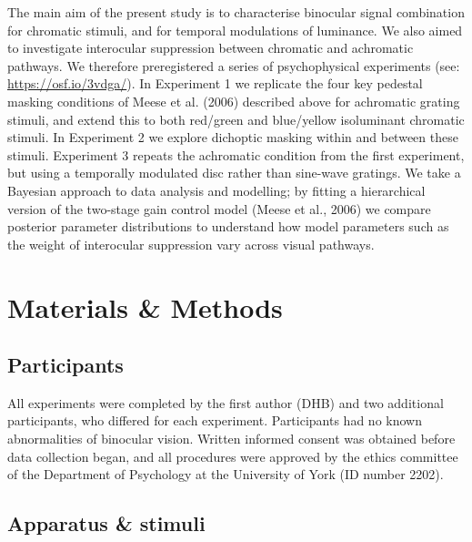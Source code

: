 \documentclass[
]{article}
\begin{document}
The main aim of the present study is to characterise binocular signal combination for chromatic stimuli, and for temporal modulations of luminance. We also aimed to investigate interocular suppression between chromatic and achromatic pathways. We therefore preregistered a series of psychophysical experiments (see: \url{https://osf.io/3vdga/}). In Experiment 1 we replicate the four key pedestal masking conditions of Meese et al. (2006) described above for achromatic grating stimuli, and extend this to both red/green and blue/yellow isoluminant chromatic stimuli. In Experiment 2 we explore dichoptic masking within and between these stimuli. Experiment 3 repeats the achromatic condition from the first experiment, but using a temporally modulated disc rather than sine-wave gratings. We take a Bayesian approach to data analysis and modelling; by fitting a hierarchical version of the two-stage gain control model (Meese et al., 2006) we compare posterior parameter distributions to understand how model parameters such as the weight of interocular suppression vary across visual pathways.

\hypertarget{materials-methods}{%
\section{Materials \& Methods}\label{materials-methods}}

\hypertarget{participants}{%
\subsection{Participants}\label{participants}}

All experiments were completed by the first author (DHB) and two additional participants, who differed for each experiment. Participants had no known abnormalities of binocular vision. Written informed consent was obtained before data collection began, and all procedures were approved by the ethics committee of the Department of Psychology at the University of York (ID number 2202).

\hypertarget{apparatus-stimuli}{%
\subsection{Apparatus \& stimuli}\label{apparatus-stimuli}}
\end{document}
